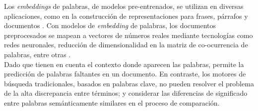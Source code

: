 Los \textit{embeddings} de palabras, de modelos pre-entrenados, se utilizan en diversas aplicaciones, como en la construcción de representaciones para frases, párrafos y documentos \cite{Brundha2022VectorMB}. Con modelos de \textit{embedding} de palabras, los documentos preprocesados se mapean a vectores de números reales mediante tecnologías como redes neuronales, reducción de dimensionalidad en la matriz de co-ocurrencia de palabras, entre otras \cite{Yuan2020ImprovingIR}.\\
Dado que tienen en cuenta el contexto donde aparecen las palabras, permite la predicción de palabras faltantes en un documento. En contraste, los motores de búsqueda tradicionales, basados en palabras clave, no pueden resolver el problema de la alta discrepancia entre términos; y considerar las diferencias de significado entre palabras semánticamente similares en el proceso de comparación. 

